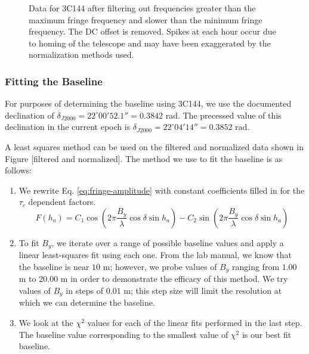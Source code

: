 \documentclass[12pt]{article}
\begin{document}
\begin{figure}[H]
\caption[SODUMB]{Data for 3C144 after filtering out frequencies greater than the maximum fringe frequency and slower than the minimum fringe frequency. The DC offset is removed. Spikes at each hour occur due to homing of the telescope and may have been exaggerated by the normalization methods used.}
\label{fig:filtered}
\end{figure}

\subsubsection{Fitting the Baseline}
For purposes of determining the baseline using 3C144, we use the documented declination of $\delta_{J2000} = 22^\circ 00'52.1'' = 0.3842$ rad. The precessed value of this declination in the current epoch is $\delta_{J2000} = 22^\circ 04'14'' = 0.3852$ rad.

A least squares method can be used on the filtered and normalized data shown in Figure [filtered and normalized]. The method we use to fit the baseline is as follows:

\begin{enumerate}
  \item We rewrite Eq. \ref{eq:fringe-amplitude} with constant coefficients filled in for the $\tau_c$ dependent factors. 
  \begin{equation}
F(h_a) = C_1 \cos{\left( 2\pi \frac{B_y}{\lambda} 
\cos{\delta} \sin{h_a} \right)} - C_2 \sin{\left( 2\pi \frac{B_y}{\lambda} 
\cos{\delta} \sin{h_a} \right)} \label{eq:fringe-amplitude}
\end{equation}

  \item To fit $B_y$, we iterate over a range of possible baseline values and apply a linear least-squares fit using each one. From the lab manual, we know that the baseline is near $10$ m; however, we probe values of $B_y$ ranging from $1.00$ m to $20.00$ m in order to demonstrate the efficacy of this method. We try values of $B_y$ in steps of $0.01$ m; this step size will limit the resolution at which we can determine the baseline.
   \item We look at the $\chi^2$ values for each of the linear fits performed in the last step. The baseline value corresponding to the smallest value of $\chi^2$ is our best fit baseline.
\end{enumerate}
\end{document}
